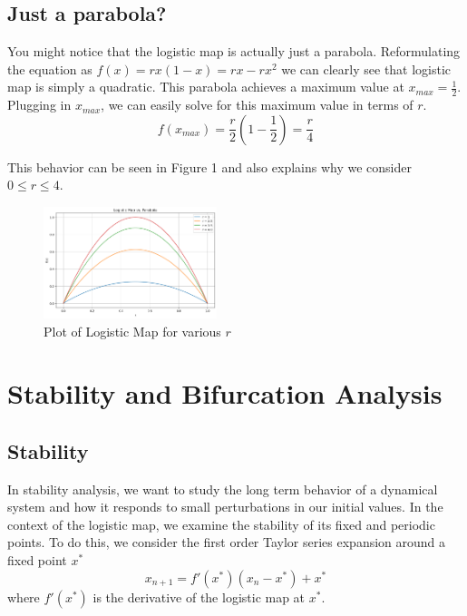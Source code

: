 \documentclass[11pt,twocolumn]{article}
\begin{document}
\subsection{Just a parabola?}
You might notice that the logistic map is actually just a parabola.
Reformulating the equation as $f(x)=rx(1-x)=rx-rx^2$ we can clearly see that logistic map is simply a quadratic. This parabola achieves a maximum value at $x_{max}=\frac{1}{2}$. Plugging in $x_{max}$, we can easily solve for this maximum value in terms of $r$.
\begin{equation}
    f(x_{max})=\frac{r}{2}(1-\frac{1}{2})=\frac{r}{4}
\end{equation}

This behavior can be seen in Figure 1 and also explains why we consider $0\leq r\leq 4$.



\begin{figure}
    \centering
\includegraphics[width=0.45\textwidth]{figures/parabolas.png}
    \caption{Plot of Logistic Map for various $r$}
    \label{fig:enter-label}
\end{figure}


\section{Stability and Bifurcation Analysis}
\subsection{Stability}
In stability analysis, we want to study the long term behavior of a dynamical system and how it responds to small perturbations in our initial values.
In the context of the logistic map, we examine the stability of its fixed and periodic points.
To do this, we consider the first order Taylor series expansion around a fixed point $x^\ast$
\begin{equation}
    x_{n+1}=f'(x^\ast)(x_n-x^\ast)+x^\ast
\end{equation}
where $f'(x^\ast)$ is the derivative of the logistic map at $x^\ast$.
\end{document}
